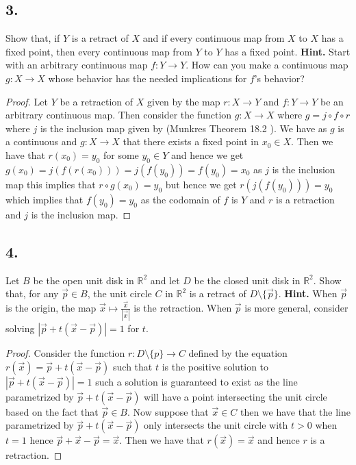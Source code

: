 \documentclass{amsart}
\theoremstyle{plain}
\theoremstyle{definition}
\theoremstyle{remark}
\begin{document}
\vspace{.15in}
\noindent
\subsection*{3.} Show that, if $Y$ is a retract of $X$ and if every continuous map from $X$ to $X$ has a fixed point, then every continuous map from $Y$ to $Y$ has a fixed point. {\bf Hint.} Start with an arbitrary continuous map $f : Y\to Y$. How can you make a continuous map $g : X\to X$ whose behavior has the needed implications for $f$'s behavior?

\begin{proof}
    Let $Y$ be a retraction of $X$ given by the map $r:X\to Y$ and $f:Y\to Y$ be an arbitrary continuous map. Then consider the function $g:X\to X$ where $g=j\circ f\circ r$ where $j$ is the inclusion map given by (Munkres Theorem 18.2 ). We have as $g$ is a continuous and $g:X \to X$ that there exists a fixed point in $x_0 \in X$. Then we have that $r(x_0)=y_0$ for some $y_0\in Y$ and hence we get $g(x_0)=j(f(r(x_0)))=j(f(y_0))=f(y_0)=x_0$ as $j$ is the inclusion map this implies that $r \circ g(x_0)=y_0$ but hence we get $r(j(f(y_0)))=y_0$ which implies that $f(y_0)=y_0$ as the codomain of $f$ is $Y$ and $r$ is a retraction and $j$ is the inclusion map.

    
\end{proof}
 


\vspace{.15in}
\noindent
\subsection*{4.} Let $B$ be the open unit disk in $\mathbb R ^2$ and let $D$ be the closed unit disk in $\mathbb R ^2$. Show that, for any $\vec{p} \in B$, the unit circle $C$ in $\mathbb R ^2$ is a retract of $D\setminus \{ \vec{p}\}$. {\bf Hint.} When $\vec{p}$ is the origin, the map $\vec{x} \mapsto \frac{\vec{x}}{|\vec{x}|}$ is the retraction. When $\vec{p}$ is more general, consider solving $|\vec{p} + t(\vec{x}-\vec{p})| = 1$ for $t$. 

\begin{proof}
    Consider the function $r: D\setminus \{p\}\to C$ defined by the equation $r(\vec{x})=\vec{p}+t(\vec x - \vec p)$ such that $t$ is the positive solution to $|\vec p + t(\vec x - \vec p)|=1$ such a solution is guaranteed to exist as the line parametrized by $\vec p + t(\vec x - \vec p)$ will have a point intersecting the unit circle based on the fact that $\vec p \in B$.  
    Now suppose that $\vec{x}\in C$ then we have that the line parametrized by $\vec{p}+t(\vec x - \vec p)$ only intersects the unit circle with $t>0$ when $t=1$ hence $\vec{p}+\vec x- \vec p= \vec x$. Then we have that $r(\vec x)=\vec x$ and hence $r$ is a retraction.


\end{proof}
\end{document}
